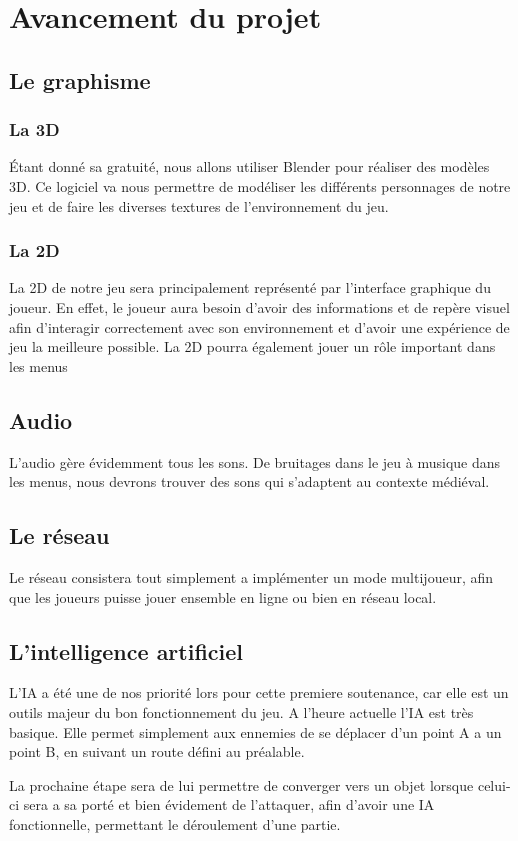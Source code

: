 \documentclass[a4paper, 12pt]{article}
\begin{document}
\section{Avancement du projet}
	\subsection{Le graphisme}
		\subsubsection{La 3D}
		Étant donné sa gratuité, nous allons utiliser Blender pour réaliser des modèles 3D. Ce logiciel va nous permettre de modéliser les différents personnages de notre jeu et de faire les diverses textures de l’environnement du jeu.

		\subsubsection{La 2D}
		La 2D de notre jeu sera principalement représenté par l'interface graphique du joueur. En effet, le joueur aura besoin d'avoir des informations et de repère visuel afin d'interagir correctement avec son environnement et d'avoir une expérience de jeu la meilleure possible. La 2D pourra également jouer un rôle important dans les menus
	\subsection{Audio}
	L’audio gère évidemment tous les sons. De bruitages dans le jeu à musique dans les menus, nous devrons trouver des sons qui s’adaptent au contexte médiéval.

	\subsection{Le réseau}
	Le réseau consistera tout simplement a implémenter un mode multijoueur, afin que les joueurs puisse jouer ensemble en ligne ou bien en réseau local.
	\subsection{L'intelligence artificiel}
	L'IA a été une de nos priorité lors pour cette premiere soutenance, car elle est un outils majeur du bon fonctionnement du jeu. A l'heure actuelle l'IA est très basique. Elle permet simplement aux ennemies de se déplacer d'un point A a un point B, en suivant un route défini au préalable.
	\par La prochaine étape sera de lui permettre de converger vers un objet lorsque celui-ci sera a sa porté et bien évidement de l'attaquer, afin d'avoir une IA fonctionnelle, permettant le déroulement d'une partie.
\end{document}
